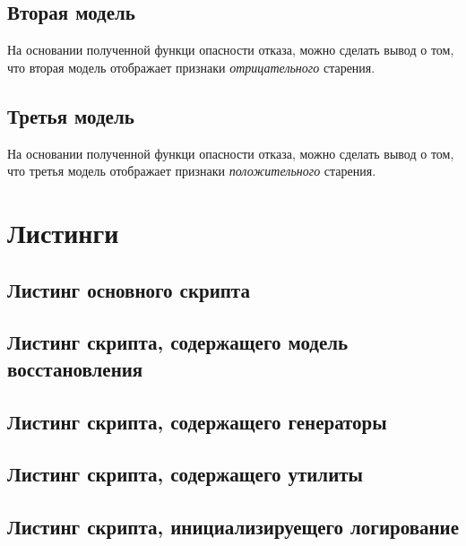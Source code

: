 \subsection*{Вторая модель}

На основании полученной функци опасности отказа, можно сделать вывод о том, что вторая модель отображает признаки
\textit{отрицательного} старения.

\subsection*{Третья модель}

На основании полученной функци опасности отказа, можно сделать вывод о том, что третья модель отображает признаки
\textit{положительного} старения.

\clearpage

\section*{Листинги}

\subsection*{Листинг основного скрипта}


\subsection*{Листинг скрипта, содержащего модель восстановления}


\subsection*{Листинг скрипта, содержащего генераторы}


\subsection*{Листинг скрипта, содержащего утилиты}


\subsection*{Листинг скрипта, инициализируещего логирование}

